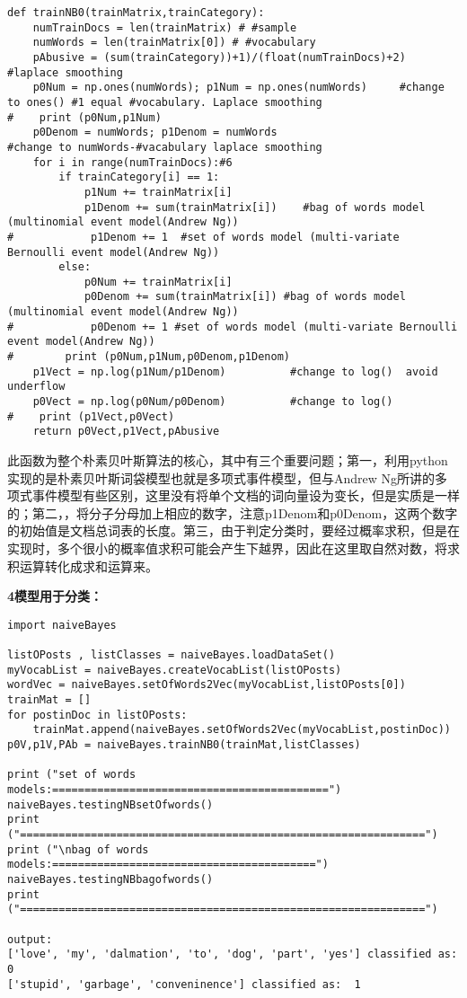 \begin{lstlisting}
def trainNB0(trainMatrix,trainCategory):
    numTrainDocs = len(trainMatrix) # #sample
    numWords = len(trainMatrix[0]) # #vocabulary
    pAbusive = (sum(trainCategory))+1)/(float(numTrainDocs)+2)     #laplace smoothing
    p0Num = np.ones(numWords); p1Num = np.ones(numWords)     #change to ones() #1 equal #vocabulary. Laplace smoothing
#    print (p0Num,p1Num)
    p0Denom = numWords; p1Denom = numWords                        #change to numWords-#vacabulary laplace smoothing
    for i in range(numTrainDocs):#6
        if trainCategory[i] == 1:
            p1Num += trainMatrix[i]
            p1Denom += sum(trainMatrix[i])    #bag of words model (multinomial event model(Andrew Ng))
#            p1Denom += 1  #set of words model (multi-variate Bernoulli event model(Andrew Ng))
        else:
            p0Num += trainMatrix[i]
            p0Denom += sum(trainMatrix[i]) #bag of words model (multinomial event model(Andrew Ng))
#            p0Denom += 1 #set of words model (multi-variate Bernoulli event model(Andrew Ng))
#        print (p0Num,p1Num,p0Denom,p1Denom)
    p1Vect = np.log(p1Num/p1Denom)          #change to log()  avoid underflow
    p0Vect = np.log(p0Num/p0Denom)          #change to log()
#    print (p1Vect,p0Vect)
    return p0Vect,p1Vect,pAbusive
\end{lstlisting}

此函数为整个朴素贝叶斯算法的核心，其中有三个重要问题；第一，利用python实现的是朴素贝叶斯词袋模型也就是多项式事件模型，但与Andrew Ng所讲的多项式事件模型有些区别，这里没有将单个文档的词向量设为变长，但是实质是一样的；第二，{\color{red}{拉普拉斯平滑}}，将分子分母加上相应的数字，注意p1Denom和p0Denom，这两个数字的初始值是文档总词表的长度。第三，由于判定分类时，要经过概率求积，但是在实现时，多个很小的概率值求积可能会产生下越界，因此在这里取自然对数，将求积运算转化成求和运算来{\color{red}{避免下越界}。}

\noindent\textbf{\textcircled{\footnotesize{4}}模型用于分类：}
\begin{lstlisting}
import naiveBayes

listOPosts , listClasses = naiveBayes.loadDataSet()
myVocabList = naiveBayes.createVocabList(listOPosts)
wordVec = naiveBayes.setOfWords2Vec(myVocabList,listOPosts[0])
trainMat = []
for postinDoc in listOPosts:
    trainMat.append(naiveBayes.setOfWords2Vec(myVocabList,postinDoc))
p0V,p1V,PAb = naiveBayes.trainNB0(trainMat,listClasses)

print ("set of words models:===========================================")
naiveBayes.testingNBsetOfwords()
print ("===============================================================")
print ("\nbag of words models:=========================================")
naiveBayes.testingNBbagofwords()
print ("===============================================================")

output:
['love', 'my', 'dalmation', 'to', 'dog', 'part', 'yes'] classified as:  0
['stupid', 'garbage', 'conveninence'] classified as:  1
\end{lstlisting}

